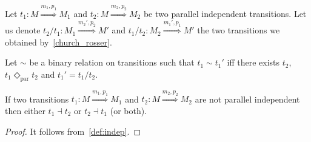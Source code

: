 

Let $t_1:M\overset{m_1,p_1}{\Rightarrow} M_1$ and $t_2:M\overset{m_2,p_2}{\Rightarrow} M_2$ be two parallel independent transitions. Let us denote $t_2/t_1:M_1\overset{m_2',p_2}{\Rightarrow} M'$ and $t_1/t_2:M_2\overset{m_1',p_1}{\Rightarrow} M'$ the two transitions we obtained by~\autoref{church_rosser}.


\begin{definition}
  \label{def:equiv_trans}
  Let $\sim$ be a binary relation on transitions such that $t_1\sim t_1'$ iff there exists $t_2$, $t_1\Diamond_{\text{par}} t_2$ and $t_1' = t_1/t_2$.
\end{definition}

\begin{lemma}
  If two transitions $t_1:M\overset{m_1,p_1}{\Rightarrow} M_1$ and $t_2:M\overset{m_2,p_2}{\Rightarrow} M_2$ are not parallel independent then either $t_1\dashv t_2$ or $t_2\dashv t_1$ (or both).
\end{lemma}
\begin{proof}
  It follows from~\autoref{def:indep}.
\end{proof}
